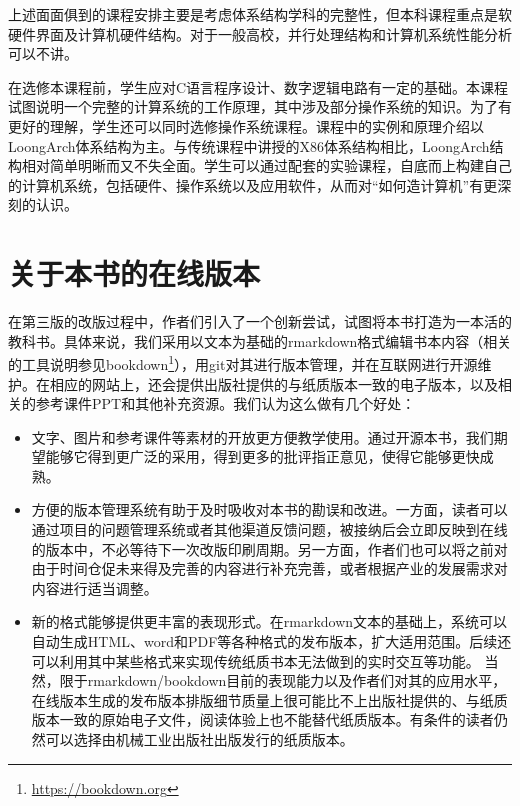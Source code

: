 \documentclass[]{ctexbook}
\providecommand{\tightlist}{%
  \setlength{\itemsep}{0pt}\setlength{\parskip}{0pt}}
\renewcommand{\href}[2]{#2\footnote{\url{#1}}}
\begin{document}
上述面面俱到的课程安排主要是考虑体系结构学科的完整性，但本科课程重点是软硬件界面及计算机硬件结构。对于一般高校，并行处理结构和计算机系统性能分析可以不讲。

在选修本课程前，学生应对C语言程序设计、数字逻辑电路有一定的基础。本课程试图说明一个完整的计算系统的工作原理，其中涉及部分操作系统的知识。为了有更好的理解，学生还可以同时选修操作系统课程。课程中的实例和原理介绍以LoongArch体系结构为主。与传统课程中讲授的X86体系结构相比，LoongArch结构相对简单明晰而又不失全面。学生可以通过配套的实验课程，自底而上构建自己的计算机系统，包括硬件、操作系统以及应用软件，从而对``如何造计算机''有更深刻的认识。

\newpage

\hypertarget{ux5173ux4e8eux672cux4e66ux7684ux5728ux7ebfux7248ux672c}{%
\chapter*{关于本书的在线版本}\label{ux5173ux4e8eux672cux4e66ux7684ux5728ux7ebfux7248ux672c}}


在第三版的改版过程中，作者们引入了一个创新尝试，试图将本书打造为一本活的教科书。具体来说，我们采用以文本为基础的rmarkdown格式编辑书本内容（相关的工具说明参见\href{https://bookdown.org}{bookdown}），用git对其进行版本管理，并在互联网进行开源维护。在相应的网站上，还会提供出版社提供的与纸质版本一致的电子版本，以及相关的参考课件PPT和其他补充资源。我们认为这么做有几个好处：

\begin{itemize}
\tightlist
\item
  文字、图片和参考课件等素材的开放更方便教学使用。通过开源本书，我们期望能够它得到更广泛的采用，得到更多的批评指正意见，使得它能够更快成熟。
\item
  方便的版本管理系统有助于及时吸收对本书的勘误和改进。一方面，读者可以通过项目的问题管理系统或者其他渠道反馈问题，被接纳后会立即反映到在线的版本中，不必等待下一次改版印刷周期。另一方面，作者们也可以将之前对由于时间仓促未来得及完善的内容进行补充完善，或者根据产业的发展需求对内容进行适当调整。
\item
  新的格式能够提供更丰富的表现形式。在rmarkdown文本的基础上，系统可以自动生成HTML、word和PDF等各种格式的发布版本，扩大适用范围。后续还可以利用其中某些格式来实现传统纸质书本无法做到的实时交互等功能。 当然，限于rmarkdown/bookdown目前的表现能力以及作者们对其的应用水平，在线版本生成的发布版本排版细节质量上很可能比不上出版社提供的、与纸质版本一致的原始电子文件，阅读体验上也不能替代纸质版本。有条件的读者仍然可以选择由机械工业出版社出版发行的纸质版本。
\end{itemize}
\end{document}
